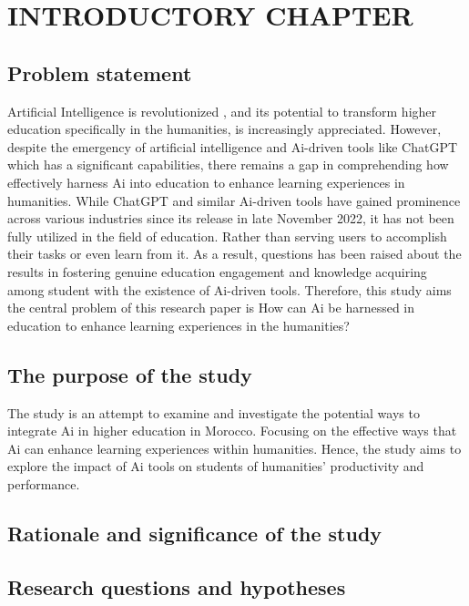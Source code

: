 \chapter{INTRODUCTORY CHAPTER}
\section{Problem statement}
\justifying
Artificial Intelligence is revolutionized , and its potential
to transform higher education specifically in the humanities, is increasingly
appreciated. However, despite the emergency of artificial intelligence and
Ai-driven tools like ChatGPT which has a significant capabilities,
there remains a gap in comprehending how effectively harness Ai into
education to enhance learning experiences in humanities. While ChatGPT
and similar Ai-driven tools have gained prominence across various
industries since its release in late November 2022, it has not been
fully utilized in the field of education. Rather than serving users
to accomplish their tasks or even learn from it. As a result, questions
has been raised about the results in fostering genuine education engagement
and knowledge acquiring among student with the existence of Ai-driven tools. Therefore, this study aims
the central problem of this research paper is How can Ai be harnessed
in education to enhance learning experiences in the humanities?
\section{The purpose of the study}
\justifying
The study is an attempt to examine and investigate the potential ways to integrate Ai in higher education in Morocco.
Focusing on the effective ways that Ai can enhance learning experiences within humanities. Hence, the study aims to 
explore the impact of Ai tools on students of humanities' productivity and performance.
\section{Rationale and significance of the study}
\justifying
\lipsum[1]
\section{Research questions and hypotheses}
